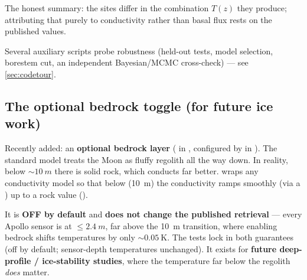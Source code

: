 \begin{keyidea}
The honest summary: the sites differ in the combination $T(z)$ they produce;
attributing that purely to conductivity rather than basal flux rests on the
published \Qb{} values.
\end{keyidea}

Several auxiliary scripts probe robustness (held-out tests, model selection,
borestem cut, an independent Bayesian/MCMC cross-check) --- see
\autoref{sec:codetour}.

\subsection{The optional bedrock toggle (for future ice work)}
\label{sec:bedrock}

Recently added: an \textbf{optional bedrock layer} ( in
, configured by  in
). The standard model treats the Moon as fluffy regolith
all the way down. In reality, below ${\sim}\SI{10}{m}$ there is solid rock, which
conducts far better.  wraps any conductivity model so that
below  (\SI{10}{m}) the conductivity ramps smoothly (via a
) up to a rock value ().

It is \textbf{OFF by default} and \textbf{does not change the published
retrieval} --- every Apollo sensor is at $\le\SI{2.4}{m}$, far above the
\SI{10}{m} transition, where enabling bedrock shifts temperatures by only
${\sim}\SI{0.05}{\kelvin}$. The tests  lock in both
guarantees (off by default; sensor-depth temperatures unchanged). It exists for
\textbf{future deep-profile / ice-stability studies}, where the temperature far
below the regolith \emph{does} matter.
